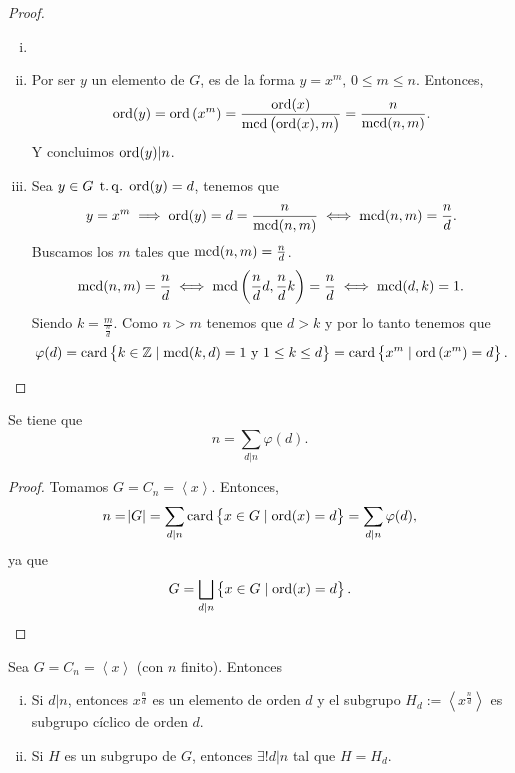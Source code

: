 \begin{proof}
    \begin{enumerate}[i)]
        \item[]
        \item Por ser $y$ un elemento de $G$, es de la forma $y=x^m,\,0\leq m\leq n$. Entonces,
                \[
                    \operatorname{ord}(y) = \operatorname{ord}\left( x^m \right) = \frac{\operatorname{ord}(x)}{\operatorname{mcd}\left(\operatorname{ord}(x), m \right)} = \frac{n}{\operatorname{mcd}(n, m)}.
                \]
            Y concluimos $\operatorname{ord}(y) \vert n$.
        \item Sea $y \in G \operatorname{\;t.q.\;} \operatorname{ord}(y) = d$, tenemos que
                \[
                    y = x^m \implies \operatorname{ord}(y) = d = \frac{n}{\operatorname{mcd}(n, m)} \iff \operatorname{mcd}(n, m) = \frac{n}{d}.
                \]
                Buscamos los $m$ tales que $\operatorname{mcd}(n, m) = \frac{n}{d}$.
                \[
                    \operatorname{mcd}(n, m) = \frac{n}{d} \iff \operatorname{mcd}\left( \frac{n}{d}d, \frac{n}{d}k \right) = \frac{n}{d}
                    \iff \operatorname{mcd}(d, k) = 1.
                \]
                Siendo $k=\frac{m}{\frac{n}{d}}$. Como $n>m$ tenemos que $d>k$ y por lo tanto tenemos que
                \[
                    \varphi(d) = \operatorname{card} \left\{ k \in \mathbb{Z} \mid \operatorname{mcd}(k, d) = 1 \text{ y } 1 \leq k \leq d\right\}
                    = \operatorname{card} \left\{ x^m \mid \operatorname{ord}\left( x^m \right) = d\right\}.
                \]
    \end{enumerate}
\end{proof}

\begin{col}
    Se tiene que
    \[
        n = \sum_{d \vert n} \varphi(d).
    \]
\end{col}

\begin{proof}
    Tomamos $G = C_n = \left< x \right>$. Entonces,
    \[
        n = \abs{G} = \sum_{d \vert n} \operatorname{card} \left\{ x \in G \mid \operatorname{ord}(x) =d \right\} = \sum_{d \vert n} \varphi(d),
    \]
    ya que
    \[
        G = \bigsqcup_{d \vert n} \left\{x \in G \mid \operatorname{ord}(x) = d\right\}.
    \]
\end{proof}

\begin{prop}
    Sea $G = C_n = \left< x \right>$ (con $n$ finito). Entonces
    \begin{enumerate}[i)]
        \item Si $d \vert n$, entonces $x^{\frac{n}{d}}$ es un elemento de orden $d$
            y el subgrupo $H_d := \left< x^{\frac{n}{d}} \right>$ es subgrupo cíclico de orden $d$.
        \item Si $H$ es un subgrupo de $G$, entonces $\exists! d \vert n$ tal que $H = H_d$.
    \end{enumerate}
\end{prop}

